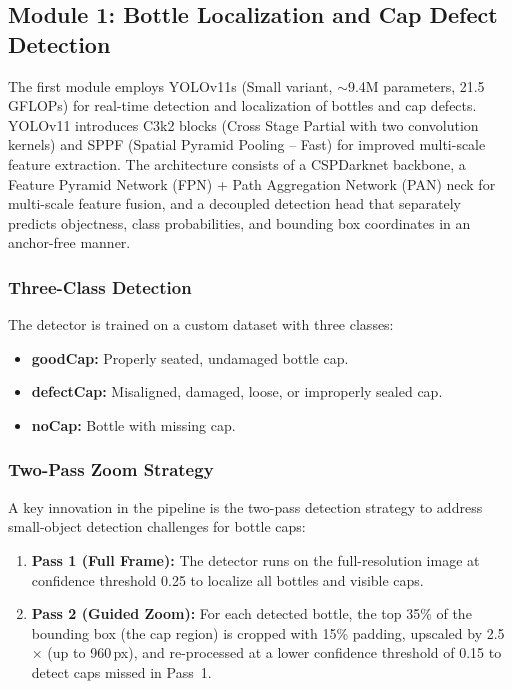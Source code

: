 \documentclass{ieeeaccess}
\begin{document}
\subsection{Module 1: Bottle Localization and Cap Defect Detection}

The first module employs YOLOv11s (Small variant, $\sim$9.4M parameters, 21.5 GFLOPs) for real-time detection and localization of bottles and cap defects. YOLOv11 introduces C3k2 blocks (Cross Stage Partial with two convolution kernels) and SPPF (Spatial Pyramid Pooling -- Fast) for improved multi-scale feature extraction. The architecture consists of a CSPDarknet backbone, a Feature Pyramid Network (FPN) + Path Aggregation Network (PAN) neck for multi-scale feature fusion, and a decoupled detection head that separately predicts objectness, class probabilities, and bounding box coordinates in an anchor-free manner.

\subsubsection{Three-Class Detection}
The detector is trained on a custom dataset with three classes:
\begin{itemize}
    \item \textbf{goodCap:} Properly seated, undamaged bottle cap.
    \item \textbf{defectCap:} Misaligned, damaged, loose, or improperly sealed cap.
    \item \textbf{noCap:} Bottle with missing cap.
\end{itemize}

\subsubsection{Two-Pass Zoom Strategy}
A key innovation in the pipeline is the two-pass detection strategy to address small-object detection challenges for bottle caps:

\begin{enumerate}
    \item \textbf{Pass 1 (Full Frame):} The detector runs on the full-resolution image at confidence threshold 0.25 to localize all bottles and visible caps.
    \item \textbf{Pass 2 (Guided Zoom):} For each detected bottle, the top 35\% of the bounding box (the cap region) is cropped with 15\% padding, upscaled by 2.5$\times$ (up to 960\,px), and re-processed at a lower confidence threshold of 0.15 to detect caps missed in Pass~1.
\end{enumerate}
\end{document}
